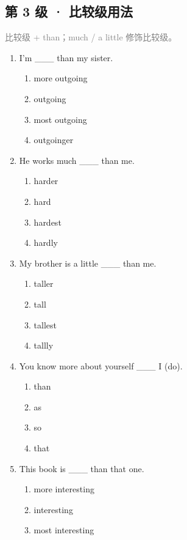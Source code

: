 \documentclass[11pt,a4paper]{ctexart}
\begin{document}
\subsection*{第 3 级 · 比较级用法}
\noindent\textcolor{gray}{比较级 + than；much / a little 修饰比较级。}\par\smallskip
\begin{enumerate}[leftmargin=*,itemsep=4pt]
\item I’m \_\_\_ than my sister.
\begin{enumerate}[label=\Alph*.,leftmargin=2em,itemsep=1pt,topsep=2pt]
\item more outgoing
\item outgoing
\item most outgoing
\item outgoinger
\end{enumerate}
\item He works much \_\_\_ than me.
\begin{enumerate}[label=\Alph*.,leftmargin=2em,itemsep=1pt,topsep=2pt]
\item harder
\item hard
\item hardest
\item hardly
\end{enumerate}
\item My brother is a little \_\_\_ than me.
\begin{enumerate}[label=\Alph*.,leftmargin=2em,itemsep=1pt,topsep=2pt]
\item taller
\item tall
\item tallest
\item tallly
\end{enumerate}
\item You know more about yourself \_\_\_ I (do).
\begin{enumerate}[label=\Alph*.,leftmargin=2em,itemsep=1pt,topsep=2pt]
\item than
\item as
\item so
\item that
\end{enumerate}
\item This book is \_\_\_ than that one.
\begin{enumerate}[label=\Alph*.,leftmargin=2em,itemsep=1pt,topsep=2pt]
\item more interesting
\item interesting
\item most interesting

\end{enumerate}
\end{enumerate}
\end{document}
